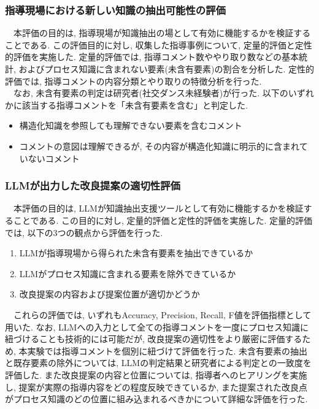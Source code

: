 \subsubsection{指導現場における新しい知識の抽出可能性の評価}
　本評価の目的は, 指導現場が知識抽出の場として有効に機能するかを検証することである. この評価目的に対し, 収集した指導事例について, 定量的評価と定性的評価を実施した. 定量的評価では, 指導コメント数ややり取り数などの基本統計, およびプロセス知識に含まれない要素(未含有要素)の割合を分析した. 定性的評価では, 指導コメントの内容分類とやり取りの特徴分析を行った.\\
　なお, 未含有要素の判定は研究者(社交ダンス未経験者)が行った. 以下のいずれかに該当する指導コメントを「未含有要素を含む」と判定した.\\
\begin{itemize}
    \item 構造化知識を参照しても理解できない要素を含むコメント
    \item コメントの意図は理解できるが, その内容が構造化知識に明示的に含まれていないコメント
\end{itemize}

\subsubsection{LLMが出力した改良提案の適切性評価}
　本評価の目的は, LLMが知識抽出支援ツールとして有効に機能するかを検証することである. この目的に対し, 定量的評価と定性的評価を実施した. 定量的評価では, 以下の3つの観点から評価を行った.\\
\begin{enumerate}
\item LLMが指導現場から得られた未含有要素を抽出できているか
\item LLMがプロセス知識に含まれる要素を除外できているか
\item 改良提案の内容および提案位置が適切かどうか
\end{enumerate}
　これらの評価では, いずれもAccuracy, Precision, Recall, F値を評価指標として用いた. なお, LLMへの入力として全ての指導コメントを一度にプロセス知識に紐づけることも技術的には可能だが, 改良提案の適切性をより厳密に評価するため, 本実験では指導コメントを個別に紐づけて評価を行った. 未含有要素の抽出と既存要素の除外については, LLMの判定結果と研究者による判定との一致度を評価した. また改良提案の内容と位置については, 指導者へのヒアリングを実施し, 提案が実際の指導内容をどの程度反映できているか, また提案された改良点がプロセス知識のどの位置に組み込まれるべきかについて詳細な評価を行った.\\

